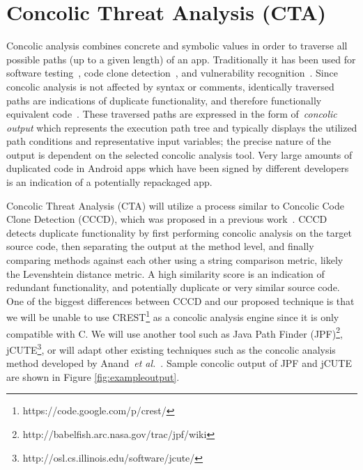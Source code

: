 \documentclass{sig-alternate}
\newif\ifisnopii
\newcommand{\todo}[1]{\textcolor{cyan}{\textbf{[#1]}}}
\begin{document}












\section{Concolic Threat Analysis (CTA)}

Concolic analysis combines concrete and symbolic values in order to traverse all possible paths (up to a given length) of an app. Traditionally it has been used for software testing~\cite{Sen:2005:CCU:1081706.1081750}, code clone detection~\cite{krutz2013cccd}, and vulnerability recognition~\cite{Chen:2014:CIB:2554850.2554875}. Since concolic analysis is not affected by syntax or comments, identically traversed paths are indications of duplicate functionality, and therefore functionally equivalent code~\cite{krutz2013cccd,krutz2013code}. These traversed paths are expressed in the form of~\emph{concolic output} which represents the execution path tree and typically displays the utilized path conditions and representative input variables; the precise nature of the output is dependent on the selected concolic analysis tool. Very large amounts of duplicated code in Android apps which have been signed by different developers is an indication of a potentially repackaged app.

Concolic Threat Analysis (CTA) will utilize a process similar to Concolic Code Clone Detection (CCCD), which \ifisnopii we \else was \fi proposed in a previous work~\cite{krutz2013cccd}. CCCD detects duplicate functionality by first performing concolic analysis on the target source code, then separating the output at the method level, and finally comparing methods against each other using a string comparison metric, likely the Levenshtein distance metric. A high similarity score is an indication of redundant functionality, and potentially duplicate or very similar source code. One of the biggest differences between CCCD and our proposed technique is that we will be unable to use CREST\footnote{https://code.google.com/p/crest/} as a concolic analysis engine since it is only compatible with C. We will use another tool such as Java Path Finder (JPF)\footnote{http://babelfish.arc.nasa.gov/trac/jpf/wiki}, jCUTE\footnote{http://osl.cs.illinois.edu/software/jcute/}, or will adapt other existing techniques such as the concolic analysis method developed by Anand~\emph{et al.}~\cite{Anand:2012:ACT:2393596.2393666}. Sample concolic output of JPF and jCUTE are shown in Figure \ref{fig:exampleoutput}.
\end{document}
